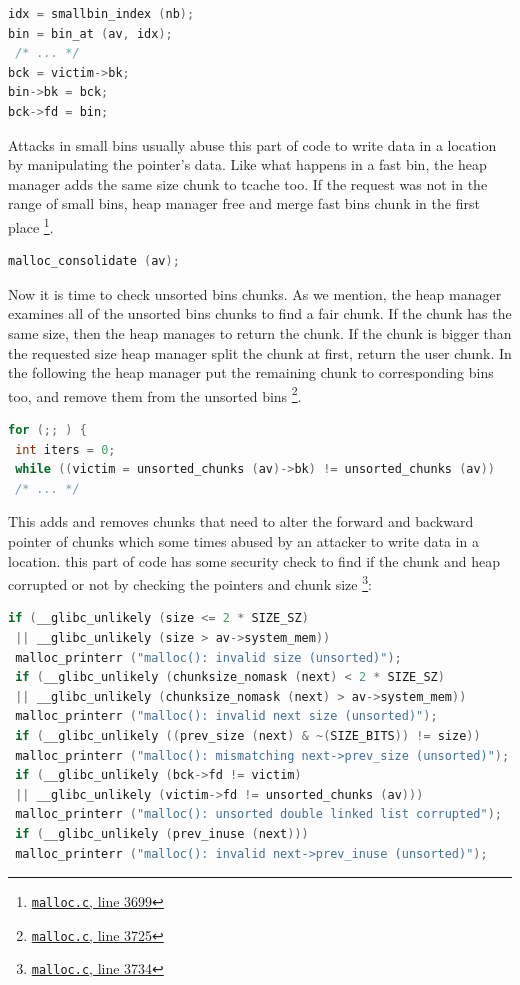\documentclass{masterthesis}
\newcommand*\tch{tcache}
\newcommand*\fb{fast bins}
\newcommand*\ub{unsorted bins}
\newcommand*\sbs{small bins}
\begin{document}
\begin{lstlisting}[language=c,frame=tlrb]
idx = smallbin_index (nb);
bin = bin_at (av, idx);
 /* ... */
bck = victim->bk;
bin->bk = bck;
bck->fd = bin;
\end{lstlisting}

Attacks in \sbs{} usually abuse this part of code to write data in a location by manipulating the pointer's data. Like what happens in a fast bin, the heap manager adds the same size chunk to \tch{} too. If the request was not in the range of \sbs{}, heap manager free and merge \fb{} chunk in the first place \footnote{\href{https://sourceware.org/git/?p=glibc.git;a=blob;f=malloc/malloc.c;h=f7cd29bc2f93e1082ee77800bd64a4b2a2897055;hb=9ea3686266dca3f004ba874745a4087a89682617\#l3699}{\texttt{malloc.c}, line 3699}}.
\begin{lstlisting}[language=c,frame=tlrb]
malloc_consolidate (av);
\end{lstlisting}

Now it is time to check \ub{} chunks. As we mention, the heap manager examines all of the \ub{} chunks to find a fair chunk. If the chunk has the same size, then the heap manages to return the chunk. If the chunk is bigger than the requested size heap manager split the chunk at first, return the user chunk. In the following the heap manager put the remaining chunk to corresponding bins too, and remove them from the \ub{} \footnote{\href{https://sourceware.org/git/?p=glibc.git;a=blob;f=malloc/malloc.c;h=f7cd29bc2f93e1082ee77800bd64a4b2a2897055;hb=9ea3686266dca3f004ba874745a4087a89682617\#l3725}{\texttt{malloc.c}, line 3725}}.

\begin{lstlisting}[language=c]
for (;; ) {
 int iters = 0;
 while ((victim = unsorted_chunks (av)->bk) != unsorted_chunks (av))
 /* ... */
\end{lstlisting}
This adds and removes chunks that need to alter the forward and backward pointer of chunks which some times abused by an attacker to write data in a location. this part of code has some security check to find if the chunk and heap corrupted or not by checking the pointers and chunk size \footnote{\href{https://sourceware.org/git/?p=glibc.git;a=blob;f=malloc/malloc.c;h=f7cd29bc2f93e1082ee77800bd64a4b2a2897055;hb=9ea3686266dca3f004ba874745a4087a89682617\#l3734}{\texttt{malloc.c}, line 3734}}:
\begin{lstlisting}[language=c,frame=tlrb]
 if (__glibc_unlikely (size <= 2 * SIZE_SZ)
 || __glibc_unlikely (size > av->system_mem))
 malloc_printerr ("malloc(): invalid size (unsorted)");
 if (__glibc_unlikely (chunksize_nomask (next) < 2 * SIZE_SZ)
 || __glibc_unlikely (chunksize_nomask (next) > av->system_mem))
 malloc_printerr ("malloc(): invalid next size (unsorted)");
 if (__glibc_unlikely ((prev_size (next) & ~(SIZE_BITS)) != size))
 malloc_printerr ("malloc(): mismatching next->prev_size (unsorted)");
 if (__glibc_unlikely (bck->fd != victim)
 || __glibc_unlikely (victim->fd != unsorted_chunks (av)))
 malloc_printerr ("malloc(): unsorted double linked list corrupted");
 if (__glibc_unlikely (prev_inuse (next)))
 malloc_printerr ("malloc(): invalid next->prev_inuse (unsorted)");
\end{lstlisting}
\end{document}
